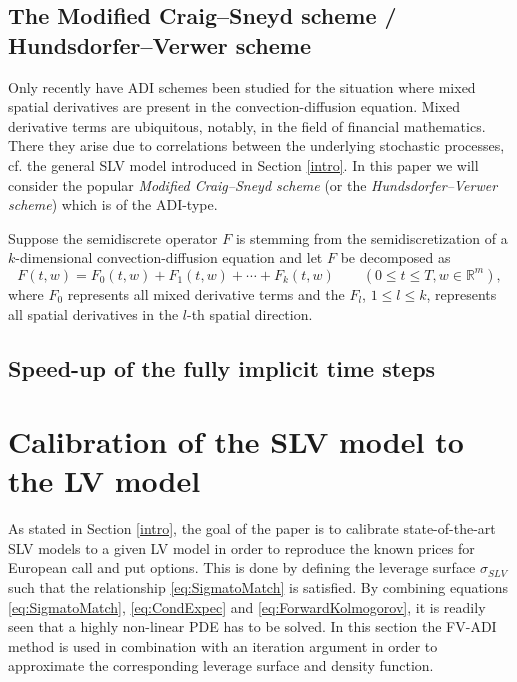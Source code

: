 \documentclass[10pt]{article}
\def\R{\mathbb{R}}
\begin{document}
\subsection{The Modified Craig--Sneyd scheme / Hundsdorfer--Verwer scheme}

Only recently have ADI schemes been studied for the situation where mixed spatial derivatives are present in the convection-diffusion equation. Mixed derivative terms are ubiquitous, notably, in the field of financial mathematics. There they arise due to correlations between the underlying stochastic processes, cf. the general SLV model introduced in Section \ref{intro}.
In this paper we will consider the popular \textit{Modified Craig--Sneyd scheme} (or the \textit{Hundsdorfer--Verwer scheme}) which is of the ADI-type.

Suppose the semidiscrete operator $F$ is stemming from the semidiscretization of a $k$-dimensional convection-diffusion equation and let $F$ be decomposed as
$$ F(t,w) = F_{0}(t,w) + F_{1}(t,w) + \cdots + F_{k}(t,w) \qquad (0 \le t \le T, w \in \R^{m}), $$
where $F_{0}$ represents all mixed derivative terms and the $F_{l}$, $1\le l \le k$, represents all spatial derivatives in the $l$-th spatial direction.








\subsection{Speed-up of the fully implicit time steps}


\setcounter{equation}{0}
\section{Calibration of the SLV model to the LV model}\label{Calibration}

As stated in Section \ref{intro}, the goal of the paper is to calibrate state-of-the-art SLV models to a given LV model in order to reproduce the known prices for European call and put options. This is done by defining the leverage surface $\sigma_{SLV}$ such that the relationship \eqref{eq:SigmatoMatch} is satisfied. By combining equations \eqref{eq:SigmatoMatch}, \eqref{eq:CondExpec} and \eqref{eq:ForwardKolmogorov}, it is readily seen that a highly non-linear PDE has to be solved. 
In this section the FV-ADI method is used in combination with an iteration argument in order to approximate the corresponding leverage surface and density function.
\end{document}
